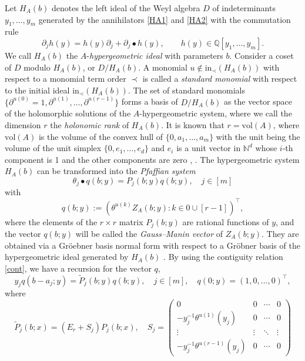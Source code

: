 \documentclass[a4paper,12pt]{article}
\theoremstyle{plain}
\theoremstyle{remark}
\begin{document}
Let $H_A(b)$ denotes the left ideal of the Weyl algebra $D$
of indeterminants $y_1,\ldots,y_m$ generated by
the annihilators \eqref{HA1} and \eqref{HA2} with
the commutation rule
\[
  \partial_j h(y)=h(y)\partial_j+
  \partial_j \bullet h(y), \qquad h(y)\in\mathbb{Q}[y_1,\ldots,y_m].
\]
We call $H_A(b)$ the $A$-{\it hypergeometric ideal} with
parameters $b$.
Consider a coset of $D$ modulo $H_A(b)$, or $D/H_A(b)$.
A monomial $u\notin\text{in}_\prec(H_A(b))$
with respect to a monomial term order $\prec$ is called
a {\it standard monomial} with respect to the initial ideal
$\text{in}_\prec(H_A(b))$. The set of standard monomials
$\{\partial^{u(0)}=1,\partial^{u(1)},\ldots,\partial^{u(r-1)}\}$
forms a basis of $D/H_A(b)$ as
the vector space of the holomorphic solutions of the $A$-hypergeometric
system, where we call the dimension $r$ the {\it holonomic rank} of
$H_A(b)$. It is known that $r=\text{vol}(A)$, where
$\text{vol}(A)$ is the volume of the convex hull of
$\{0, a_1,\ldots,a_m\}$ with the unit being the volume of
the unit simplex $\{0, e_1,\ldots,e_d\}$ and $e_i$ is
a unit vector in $\mathbb{N}^d$ whose $i$-th component is 1
and the other components are zero \cite[Theorem 1.4]{GKZ90},
\cite[Theorem 3]{OT09}.
The hypergeometric system $H_A(b)$ can be transformed into
the {\it Pfaffian system}
\[
  \theta_j \bullet q(b;y)=P_j(b;y) q(b;y), \quad
  j\in [m]
\]
with
\begin{equation}
  q(b;y):=(\theta^{u(k)}Z_A(b;y):k\in 0\cup[r-1])^\top,
  \label{GMvec}
\end{equation}
where the elements of the $r\times r$ matrix $P_j(b;y)$
are rational functions of $y$, and the vector $q(b;y)$ will
be called the {\it Gauss--Manin vector} of $Z_A(b;y)$.
They are obtained via a Gr\"oebner basis normal form with
respect to a Gr\"obner basis of the hypergeometric ideal
generated by $H_A(b)$ \cite[Theorem 1.4.22]{SST00}.
By using the contiguity relation \eqref{cont}, we have
a recursion for the vector $q$,
\[
  y_jq(b-a_j;y)=\tilde{P}_j(b;y)q(b;y), \quad j\in[m],
  \quad q(0;y)=(1,0,\ldots,0)^\top,
\]
where
\[
  \tilde{P}_j(b;x)=(E_r+S_j)P_j(b;x), \quad
S_j=\left(\begin{array}{cccc}
  0 & 0 & \cdots & 0 \\
  -y_j^{-1}\theta^{u(1)}(y_j) & 0 & \cdots & 0 \\
  \vdots & \vdots & \ddots & \vdots \\
  -y_j^{-1}\theta^{u(r-1)}(y_j) & 0 & \cdots & 0
\end{array}\right)  
\]
\end{document}
